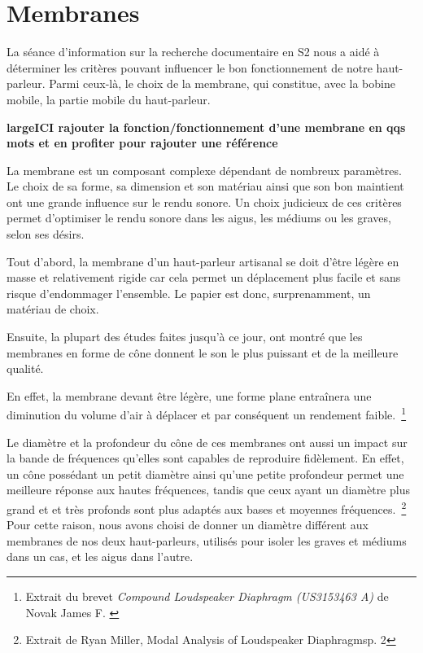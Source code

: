 \section{Membranes}

La séance d’information sur la recherche documentaire en S2
nous a aidé à déterminer les critères pouvant influencer
le bon fonctionnement de notre haut-parleur.
Parmi ceux-là, le choix de la membrane, qui constitue, avec la bobine mobile, la partie mobile
du haut-parleur.


\textbf{large{ICI rajouter la fonction/fonctionnement d'une membrane en qqs mots} et en profiter pour rajouter une référence}


La membrane est un composant complexe dépendant de nombreux paramètres. Le choix de sa forme, sa dimension et son matériau ainsi que son bon maintient ont une grande influence sur le rendu sonore. Un choix judicieux de ces critères permet d'optimiser le rendu sonore dans les aigus, les médiums ou les graves, selon ses désirs.

Tout d’abord, la membrane d’un haut-parleur artisanal
se doit d’être légère en masse et relativement rigide
car cela permet un déplacement plus facile et
sans risque d’endommager l’ensemble.
Le papier est donc, surprenamment, un matériau de choix.

Ensuite, la plupart des études faites jusqu’à ce jour,
ont montré que les membranes en forme de cône
donnent le son le plus puissant et de la meilleure qualité.

En effet, la membrane devant être légère, une forme plane entraînera une diminution du volume d’air à déplacer et par conséquent un rendement faible.~\footnote{Extrait du brevet \textit{\og Compound Loudspeaker Diaphragm (US3153463 A)\fg} de Novak James F. \cite{f1964compound}}

Le diamètre et la profondeur du cône de ces membranes
ont aussi un impact sur la bande de fréquences
qu’elles sont capables de reproduire fidèlement.
En effet, un cône possédant un petit diamètre ainsi qu'une petite profondeur
permet une meilleure réponse aux hautes fréquences,
tandis que ceux ayant un diamètre plus grand et et très profonds sont plus adaptés aux bases et moyennes fréquences.~\footnote{Extrait de Ryan Miller, \og Modal Analysis of Loudspeaker Diaphragms\fg p. 2}
Pour cette raison, nous avons choisi de donner un diamètre
différent aux membranes de nos deux haut-parleurs,
utilisés pour isoler les graves et médiums dans un cas,
et les aigus dans l'autre.

